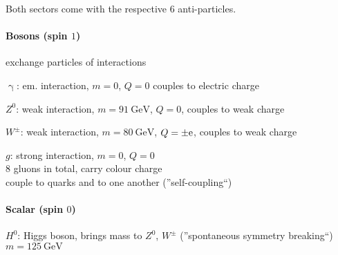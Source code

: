 Both sectors come with the respective 6 anti-particles.

\paragraph{Bosons (spin $1$)} exchange particles of interactions
\begin{compactitem}
    \item[$\upgamma$:] em. interaction, $m=0$, $Q=0$ couples to electric charge
    \item[$Z^0$:] weak interaction, $m = \SI{91}{\giga\eV}$, $Q=0$, couples to weak charge
    \item[$W^\pm$:] weak interaction, $m = \SI{80}{\giga\eV}$, $Q = \pm \mathrm{e}$, couples to weak charge
    \item[$g$:] strong interaction, $m=0$, $Q=0$\\
    8 gluons in total, carry colour charge\\
    couple to quarks and to one another (''self-coupling``)
\end{compactitem}

\paragraph{Scalar (spin $0$)}
\begin{compactitem}
    \item[$H^0$:] Higgs boson, brings mass to $Z^0$, $W^\pm$ (''spontaneous symmetry breaking``)\\
    $m = \SI{125}{\giga\eV}$
\end{compactitem}

